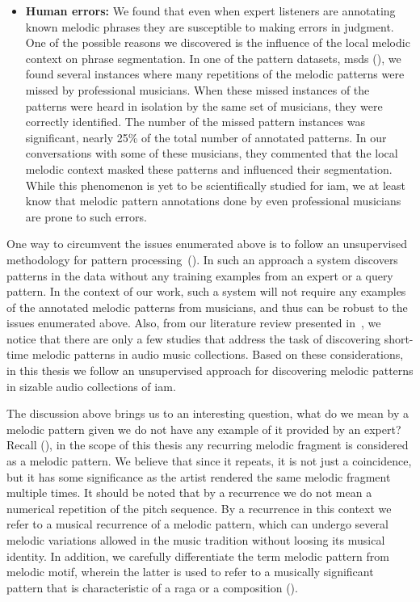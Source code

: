 \begin{itemize}
	\item \textbf{Human errors:} We found that even when expert listeners are annotating known melodic phrases they are susceptible to making errors in judgment. One of the possible reasons we discovered is the influence of the local melodic context on phrase segmentation. In one of the pattern datasets, \acrshort{msds} (), we found several instances where many repetitions of the melodic patterns were missed by professional musicians. When these missed instances of the patterns were heard in isolation by the same set of musicians, they were correctly identified. The number of the missed pattern instances was significant, nearly 25\% of the total number of annotated patterns. In our conversations with some of these musicians, they commented that the local melodic context masked these patterns and influenced their segmentation. While this phenomenon is yet to be scientifically studied for \gls{iam}, we at least know that melodic pattern annotations done  by even professional musicians are prone to such errors. 			
\end{itemize}

One way to circumvent the issues enumerated above is to follow an unsupervised methodology for pattern processing~(). In such an approach a system discovers patterns in the data without any training examples from an expert or a query pattern. In the context of our work, such a system will not require any examples of the annotated melodic patterns from musicians, and thus can be robust to the issues enumerated above. Also, from our literature review presented in~, we notice that there are only a few studies that address the task of discovering short-time melodic patterns in audio music collections. Based on these considerations, in this thesis we follow an unsupervised approach for discovering melodic patterns in sizable audio collections of \gls{iam}. 

The discussion above brings us to an interesting question, what do we mean by a melodic pattern given we do not have any example of it provided by an expert? Recall (), in the scope of this thesis any recurring melodic fragment is considered as a melodic pattern. We believe that since it repeats, it is not just a coincidence, but it has some significance as the artist rendered the same melodic fragment multiple times. It should be noted that by a recurrence we do not mean a numerical repetition of the pitch sequence. By a recurrence in this context we refer to a musical recurrence of a melodic pattern, which can undergo several melodic variations allowed in the music tradition without loosing its musical identity. In addition, we carefully differentiate the term melodic pattern from melodic motif, wherein the latter is used to refer to a musically significant pattern that is characteristic of a \gls{raga} or a composition (). 


